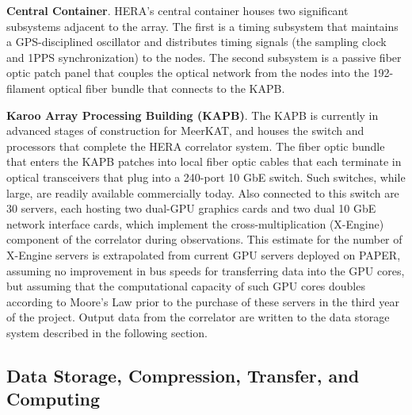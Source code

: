 \documentclass[ars]{copernicus}
\begin{document}
{\bf Central Container}.
HERA's central container houses two significant subsystems adjacent to the array.  The first is a timing subsystem
that maintains a GPS-disciplined oscillator and distributes timing
signals (the sampling clock and 1PPS synchronization) to the nodes.  The second
subsystem is a passive fiber optic patch panel that couples
the optical network from the nodes into the 192-filament optical fiber bundle 
that connects to the KAPB. 

{\bf Karoo Array Processing Building (KAPB)}.
The KAPB is currently
in advanced stages of construction for MeerKAT, and houses the switch and processors
that 
complete the HERA correlator system.  The fiber optic bundle that enters the KAPB patches
into local fiber optic cables 
that each terminate in optical transceivers that plug into a 240-port 10 GbE switch.
Such switches, while large, are readily available commercially today.  Also connected to
this switch are 30 servers, each hosting two dual-GPU graphics cards and two dual
10 GbE network interface cards, which implement the cross-multiplication (X-Engine) component
of the correlator during observations.  This estimate for the number of X-Engine servers
is extrapolated from current GPU servers deployed on PAPER, assuming no improvement in bus
speeds for transferring data into the GPU cores, but assuming that the computational
capacity of such GPU cores doubles according to Moore's Law prior to the purchase of
these servers in the third year of the project.
Output data from the correlator are written to the data storage system described
in the following section.


\subsection{Data Storage, Compression, Transfer, and Computing}
\label{sec:data}
\end{document}
